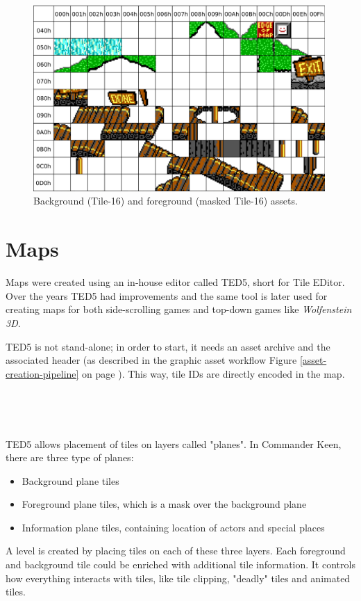 \documentclass[book.tex]{subfiles}
\begin{document}
\begin{figure}[H] 
  \centering 
  \includegraphics[width=0.99\textwidth, frame]{screenshots_300dpi/tile16M_assets.png}
  \caption{Background (Tile-16) and foreground (masked Tile-16) assets.}
  \label{fig:tile16_assets}
\end{figure} 



\section{Maps}
Maps were created using an in-house editor called TED5, short for Tile EDitor. Over the years TED5 had improvements and the same tool is later used for creating maps for both side-scrolling games and top-down games like \textit{Wolfenstein 3D}.\\
\par
 TED5 is not stand-alone; in order to start, it needs an asset archive and the  associated header (as described in the graphic asset workflow Figure \ref{asset-creation-pipeline} on page \pageref{asset-creation-pipeline}). This way, tile IDs are directly encoded in the map.\\

 
 \par
 \\
 \par
{}\\
 
 \par
TED5 allows placement of tiles on layers called "planes". In Commander Keen, there are three type of planes:
\begin{itemize}
  \item Background plane tiles
  \item Foreground plane tiles, which is a mask over the background plane
  \item Information plane tiles, containing location of actors and special places
\end{itemize}
A level is created by placing tiles on each of these three layers. Each foreground and background tile could be enriched with additional tile information. It controls how everything interacts with tiles, like tile clipping, "deadly" tiles and animated tiles. \\
\end{document}
